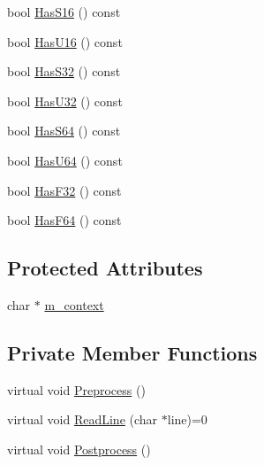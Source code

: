 \begin{DoxyCompactItemize}
\item 
bool \hyperlink{classmage_1_1_line_reader_af95711df4713d54f590c230e609b98aa}{Has\+S16} () const
\item 
bool \hyperlink{classmage_1_1_line_reader_af2c4d2414dbcaa2edb968725d2cd1555}{Has\+U16} () const
\item 
bool \hyperlink{classmage_1_1_line_reader_ae27570a3d50f3e68f71c334016362e7e}{Has\+S32} () const
\item 
bool \hyperlink{classmage_1_1_line_reader_a81ef171c6511a7b270a5b8d58181715c}{Has\+U32} () const
\item 
bool \hyperlink{classmage_1_1_line_reader_a132804ad3f6a004da5ece8a00cda16f5}{Has\+S64} () const
\item 
bool \hyperlink{classmage_1_1_line_reader_a638e055df8a1850e2e5cb9c91f8c54fc}{Has\+U64} () const
\item 
bool \hyperlink{classmage_1_1_line_reader_a2b2b2719576045b6531a2b8b31c61cee}{Has\+F32} () const
\item 
bool \hyperlink{classmage_1_1_line_reader_a65f4edadd232fdd19c7ba9d044c7d2aa}{Has\+F64} () const
\end{DoxyCompactItemize}
\subsection*{Protected Attributes}
\begin{DoxyCompactItemize}
\item 
char $\ast$ \hyperlink{classmage_1_1_line_reader_a2f1cfe313dc89741386178e63a6b8b0c}{m\+\_\+context}
\end{DoxyCompactItemize}
\subsection*{Private Member Functions}
\begin{DoxyCompactItemize}
\item 
virtual void \hyperlink{classmage_1_1_line_reader_a4de135cfb0434be786cfcfd7959031ef}{Preprocess} ()
\item 
virtual void \hyperlink{classmage_1_1_line_reader_acfb2f7279ec77d070a86d7db812d4745}{Read\+Line} (char $\ast$line)=0
\item 
virtual void \hyperlink{classmage_1_1_line_reader_adfde21013140a1058d3dd567204abfb5}{Postprocess} ()
\end{DoxyCompactItemize}
